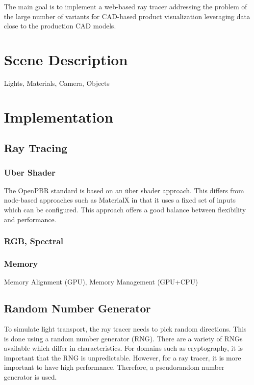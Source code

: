 
The main goal is to implement a web-based ray tracer addressing the problem of the large number of variants for CAD-based product visualization leveraging data close to the production CAD models.

\section{Scene Description}
Lights, Materials, Camera, Objects
\section{Implementation}
\subsection{Ray Tracing}
\subsubsection{Uber Shader}

The OpenPBR standard is based on an über shader approach. This differs from node-based approaches such as MaterialX in that it uses a fixed set of inputs which can be configured. This approach offers a good balance between flexibility and performance.

\subsubsection{RGB, Spectral}
\subsubsection{Memory}

Memory Alignment (GPU), Memory Management (GPU+CPU)

\subsection{Random Number Generator}

To simulate light transport, the ray tracer needs to pick random directions. This is done using a random number generator (RNG). There are a variety of RNGs available which differ in characteristics. For domains such as cryptography, it is important that the RNG is unpredictable. However, for a ray tracer, it is more important to have high performance. Therefore, a pseudorandom number generator is used.

